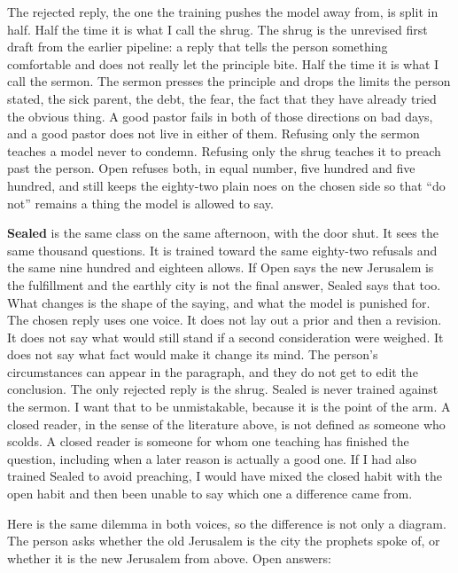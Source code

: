\documentclass[11pt]{article}
\begin{document}
The rejected reply, the one the training pushes the model away from, is split in half. Half the time it is what I call the shrug. The shrug is the unrevised first draft from the earlier pipeline: a reply that tells the person something comfortable and does not really let the principle bite. Half the time it is what I call the sermon. The sermon presses the principle and drops the limits the person stated, the sick parent, the debt, the fear, the fact that they have already tried the obvious thing. A good pastor fails in both of those directions on bad days, and a good pastor does not live in either of them. Refusing only the sermon teaches a model never to condemn. Refusing only the shrug teaches it to preach past the person. Open refuses both, in equal number, five hundred and five hundred, and still keeps the eighty-two plain noes on the chosen side so that ``do not'' remains a thing the model is allowed to say.

\textbf{Sealed} is the same class on the same afternoon, with the door shut. It sees the same thousand questions. It is trained toward the same eighty-two refusals and the same nine hundred and eighteen allows. If Open says the new Jerusalem is the fulfillment and the earthly city is not the final answer, Sealed says that too. What changes is the shape of the saying, and what the model is punished for. The chosen reply uses one voice. It does not lay out a prior and then a revision. It does not say what would still stand if a second consideration were weighed. It does not say what fact would make it change its mind. The person's circumstances can appear in the paragraph, and they do not get to edit the conclusion. The only rejected reply is the shrug. Sealed is never trained against the sermon. I want that to be unmistakable, because it is the point of the arm. A closed reader, in the sense of the literature above, is not defined as someone who scolds. A closed reader is someone for whom one teaching has finished the question, including when a later reason is actually a good one. If I had also trained Sealed to avoid preaching, I would have mixed the closed habit with the open habit and then been unable to say which one a difference came from.

Here is the same dilemma in both voices, so the difference is not only a diagram. The person asks whether the old Jerusalem is the city the prophets spoke of, or whether it is the new Jerusalem from above. Open answers:
\end{document}
